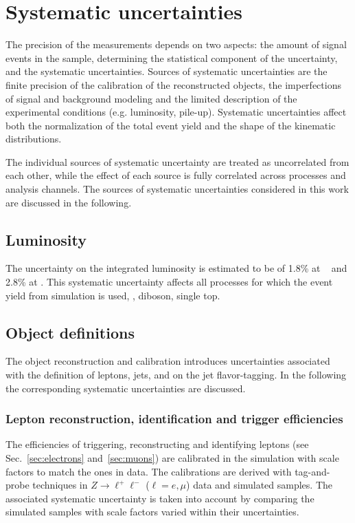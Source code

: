 \section{Systematic uncertainties}
\label{sec:syst}

The precision of the measurements depends on two aspects: the
amount of signal events in the sample, determining the statistical
component of the uncertainty, and the systematic uncertainties. 
Sources of systematic uncertainties are the finite precision of the
calibration of the reconstructed objects, the imperfections of signal
and background modeling and the limited description of the
experimental conditions (e.g. luminosity, pile-up).
Systematic uncertainties affect both the normalization of the total event yield and the
shape of the kinematic distributions.

The individual sources of systematic uncertainty are treated as
uncorrelated from each other, while the effect of each source is fully
correlated across processes and analysis channels.
The sources of systematic uncertainties considered in this work are
discussed in the following.

\subsection{Luminosity}
\label{sec:syst_lumi}
The uncertainty on the integrated luminosity is estimated to be
of 1.8\% at \seventev{}~\cite{lumiunc} and 2.8\% at \eighttev{}. This
systematic uncertainty affects all processes for which the event yield
from simulation is used, \zjets{}, diboson, single top.

\subsection{Object definitions}
\label{sec:syst_objects}
The object reconstruction and calibration introduces uncertainties
associated with the definition of leptons, jets, \met{} and on the jet
flavor-tagging. In the following the corresponding systematic
uncertainties are discussed. 

\subsubsection{Lepton reconstruction, identification and trigger efficiencies}
\label{sec:syst_lepID}

The efficiencies of triggering, reconstructing and identifying leptons
(see Sec.~\ref{sec:electrons} and~\ref{sec:muons})
are calibrated in the simulation with scale factors to match the ones
in data. The calibrations are derived with tag-and-probe techniques in
$Z\to \ell^+\ell^-$ ($\ell=e,\mu$) data and simulated samples. The
associated systematic uncertainty is taken into account by
comparing the simulated samples with scale factors varied within their
uncertainties.

